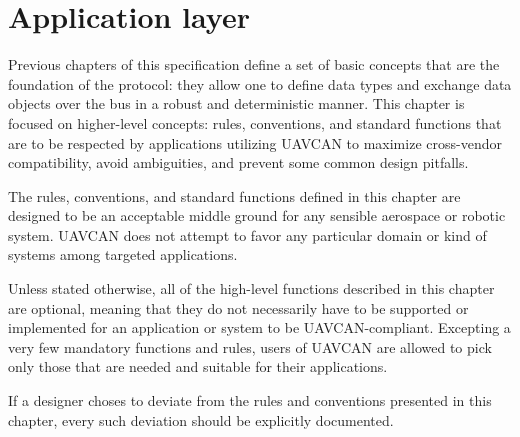 \chapter{Application layer}\label{sec:application_layer}

Previous chapters of this specification define a set of basic concepts that are the foundation of the protocol:
they allow one to define data types and exchange data objects over the bus in a robust and deterministic manner.
This chapter is focused on higher-level concepts: rules, conventions, and standard functions that are to be
respected by applications utilizing UAVCAN to maximize cross-vendor compatibility, avoid ambiguities, and
prevent some common design pitfalls.

The rules, conventions, and standard functions defined in this chapter are designed to be an acceptable middle
ground for any sensible aerospace or robotic system.
UAVCAN does not attempt to favor any particular domain or kind of systems among targeted applications.

Unless stated otherwise, all of the high-level functions described in this chapter are optional,
meaning that they do not necessarily have to be supported or implemented for an application or system to be
UAVCAN-compliant.
Excepting a very few mandatory functions and rules, users of UAVCAN are allowed to pick only those
that are needed and suitable for their applications.

If a designer choses to deviate from the rules and conventions presented in this chapter,
every such deviation should be explicitly documented.

\clearpage
\clearpage
